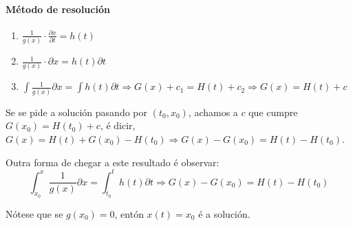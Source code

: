 \documentclass[11pt, a4paper,twoside]{article}
\theoremstyle{theorem-style}  %
\theoremstyle{definition-style}
\theoremstyle{example-style}
\begin{document}
\paragraph{Método de resolución}
\begin{enumerate}
	\item $ \frac{1}{g(x)}\cdot\frac{\partial x}{\partial t}=h(t) $
	\item $ \frac{1}{g(x)}\cdot\partial x=h(t)\partial t $
	\item $ \int \frac{1}{g(x)} \partial x= \int h(t) \partial t \Rightarrow G(x)+c_1=H(t)+c_2 \Rightarrow G(x)=H(t)+c$
\end{enumerate}
Se se pide a solución pasando por $ (t_0,x_0) $, achamos a $ c $ que cumpre $ G(x_0)=H(t_0)+c $, é dicir, $ G(x)=H(t)+G(x_0)-H(t_0) \Rightarrow G(x)-G(x_0)=H(t)-H(t_0)$.

Outra forma de chegar a este resultado é observar:
\[ \int_{x_0}^{x} \frac{1}{g(x)} \partial x= \int_{t_0}^{t} h(t) \partial t \Rightarrow G(x)-G(x_0)=H(t)-H(t_0)\]

Nótese que se $ g(x_0)=0 $, entón $ x(t)=x_0 $ é a solución.
\end{document}
